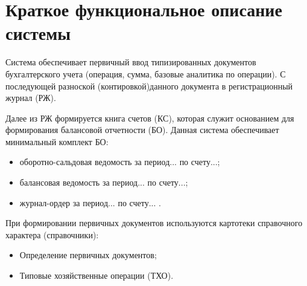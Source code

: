 \section{Краткое функциональное описание системы}

Система обеспечивает первичный ввод типизированных документов бухгалтерского учета
(операция, сумма, базовые аналитика по операции).
С последующей разноской (контировкой)данного документа в регистрационный журнал (РЖ). 

Далее из РЖ формируется книга счетов (КС), которая служит основанием для формирования балансовой отчетности (БО).
Данная система обеспечивает минимальный комплект БО:
\begin{itemize}
    \item оборотно-сальдовая ведомость за период... по счету...;
    \item балансовая ведомость за период... по счету...;
    \item журнал-ордер за период... по счету... .
\end{itemize}

При формировании первичных документов используются картотеки справочного характера (справочники):
\begin{itemize}
    \item Определение первичных документов;
    \item Типовые хозяйственные операции (ТХО).
\end{itemize}

\newpage
